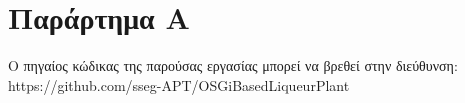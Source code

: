 
\chapter*{Παράρτημα Α}

\label{AppendixA} 
\pagestyle{empty} 	
\pagestyle{fancy}
\fancyhead[RO,LE]{\small\thepage}


{\huge{}}

\noindent Ο πηγαίος κώδικας της παρούσας εργασίας μπορεί να βρεθεί στην διεύθυνση: https://github.com/sseg-APT/OSGiBasedLiqueurPlant
